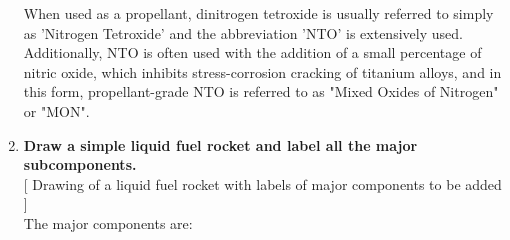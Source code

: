 \begin{enumerate}
When used as a propellant, dinitrogen tetroxide is usually referred to simply as 'Nitrogen Tetroxide' and the abbreviation 'NTO' is extensively used. Additionally, NTO is often used with the addition of a small percentage of nitric oxide, which inhibits stress-corrosion cracking of titanium alloys, and in this form, propellant-grade NTO is referred to as "Mixed Oxides of Nitrogen" or "MON". \cite{nto}
	
	\item {\bf Draw a simple liquid fuel rocket and label all the major subcomponents.}\\

[ Drawing of a liquid fuel rocket with labels of major components to be added ]\\

The major components are:
\begin{itemize}


\end{itemize}
\end{enumerate}
